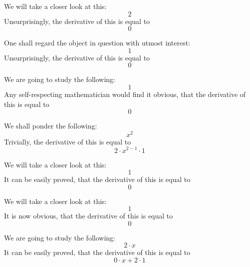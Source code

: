 \documentclass{article}
\begin{document}
We will take a closer look at this:
\begin{equation}
2 
\end{equation}
Unsurprisingly, the derivative of this is equal to
\begin{equation}
0 
\end{equation}

One shall regard the object in question with utmost interest:
\begin{equation}
1 
\end{equation}
Unsurprisingly, the derivative of this is equal to
\begin{equation}
0 
\end{equation}

We are going to study the following:
\begin{equation}
1 
\end{equation}
Any self-respecting mathematician would find it obvious, that the derivative of this is equal to
\begin{equation}
0 
\end{equation}

We shall ponder the following:
\begin{equation}
x ^{2 } 
\end{equation}
Trivially, the derivative of this is equal to
\begin{equation}
2 \cdot x ^{2 - 1 } \cdot 1 
\end{equation}

We will take a closer look at this:
\begin{equation}
1 
\end{equation}
It can be easily proved, that the derivative of this is equal to
\begin{equation}
0 
\end{equation}

We will take a closer look at this:
\begin{equation}
1 
\end{equation}
It is now obvious, that the derivative of this is equal to
\begin{equation}
0 
\end{equation}

We are going to study the following:
\begin{equation}
2 \cdot x 
\end{equation}
It can be easily proved, that the derivative of this is equal to
\begin{equation}
0 \cdot x + 2 \cdot 1 
\end{equation}
\end{document}
